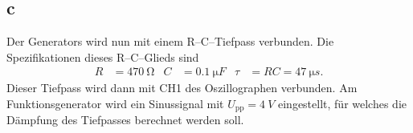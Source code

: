 \documentclass[a4paper,10pt]{article}
\numberwithin{equation}{section}
\begin{document}
\subsection{c}
Der Generators wird nun mit einem R--C--Tiefpass verbunden.
Die Spezifikationen dieses R--C--Glieds sind
\begin{align} 
        R &= \SI{470}{\ohm} & C &= \SI{0.1}{\micro F} & \tau &= RC = \SI{47}{\micro s}
.\end{align} 
Dieser Tiefpass wird dann mit CH1 des Oszillographen verbunden.
Am Funktionsgenerator wird ein Sinussignal mit $U_\text{pp}=\SI{4}{V}$ eingestellt, für welches die Dämpfung des Tiefpasses berechnet werden soll.

\clearpage
\listoffigures
\listoftables




\end{document}

